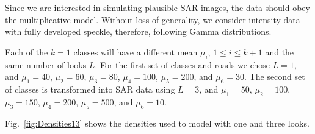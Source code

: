 \documentclass[journal]{IEEEtran}
\begin{document}
Since we are interested in simulating plausible SAR images, the data should obey the multiplicative model.
Without loss of generality, we consider intensity data with fully developed speckle, therefore, following Gamma distributions.

Each of the $k=1$ classes will have a different mean $\mu_i$, $1\leq i\leq k+1$ and the same number of looks $L$.
For the first set of classes and roads we chose $L=1$, and 
$\mu_1=40$,
$\mu_2=60$,
$\mu_3=80$,
$\mu_4=100$, 
$\mu_5=200$, and
$\mu_6=30$.
The second set of classes is transformed into SAR data using $L=3$, and 
$\mu_1=50$,
$\mu_2=100$,
$\mu_3=150$,
$\mu_4=200$, 
$\mu_5=500$, and
$\mu_6=10$.

Fig.~\ref{fig:Densities13} shows the densities used to model with one and three looks.

\begin{figure}
\centering
{}

\end{figure}
\end{document}

